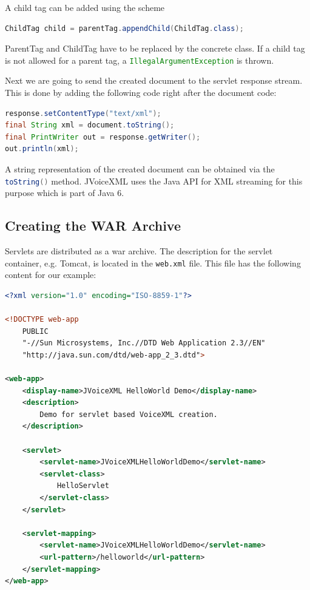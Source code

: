 \documentclass[11pt,a4paper]{book}
\begin{document}
A child tag can be added using the scheme
\begin{lstlisting}[language=Java]
ChildTag child = parentTag.appendChild(ChildTag.class);
\end{lstlisting}

ParentTag and ChildTag have to be replaced by the concrete class. If a child
tag is not allowed for a parent tag, a \lstinline[language=Java]{IllegalArgumentException} is
thrown.

Next we are going to send the created document to the servlet response stream.
This is done by adding the following code right after the document code:

\begin{lstlisting}[language=Java]
response.setContentType("text/xml");
final String xml = document.toString();
final PrintWriter out = response.getWriter();
out.println(xml);
\end{lstlisting}

A string representation of the created document can be obtained via the
\lstinline[language=Java]{toString()} method. JVoiceXML uses the Java API for
XML streaming for this purpose which is part of Java 6.

\subsection{Creating the WAR Archive}

Servlets are distributed as a war archive. The description for the servlet
container, e.g. Tomcat, is located in the \texttt{web.xml} file.
This file has the following content for our example:

\begin{lstlisting}[language=XML]
<?xml version="1.0" encoding="ISO-8859-1"?>

<!DOCTYPE web-app
    PUBLIC
    "-//Sun Microsystems, Inc.//DTD Web Application 2.3//EN"
    "http://java.sun.com/dtd/web-app_2_3.dtd">

<web-app>
    <display-name>JVoiceXML HelloWorld Demo</display-name>
    <description>
        Demo for servlet based VoiceXML creation.
    </description>

    <servlet>
        <servlet-name>JVoiceXMLHelloWorldDemo</servlet-name>
        <servlet-class>
            HelloServlet
        </servlet-class>
    </servlet>

    <servlet-mapping>
        <servlet-name>JVoiceXMLHelloWorldDemo</servlet-name>
        <url-pattern>/helloworld</url-pattern>
    </servlet-mapping>
</web-app>
\end{lstlisting}
\end{document}
